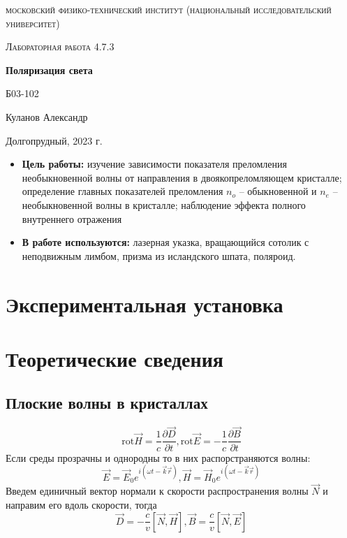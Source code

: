 \documentclass[a4paper, 12pt]{article}
\begin{document}
\begin{titlepage}
	\centering
	\vspace{5cm}
	{\scshape\LARGE московский физико-технический институт (национальный исследовательский университет) \par}
	\vspace{6cm}
	{\scshape\Large Лабораторная работа 4.7.3 \par}
	{\huge\bfseries Поляризация света \par}
	\vspace{1cm}
	\vfill
\begin{flushright}
	{\large Б03-102}\par
	\vspace{0.3cm}
	{\LARGE Куланов Александр}
\end{flushright}
	

	\vfill


	Долгопрудный, 2023 г.
\end{titlepage}

\begin{itemize}
	\item \textbf{Цель работы:} изучение зависимости показателя преломления необыкновенной волны от направления в двоякопреломляющем кристалле; определение главных показателей преломления $n_o$ -- обыкновенной и $n_e$ -- необыкновенной волны в кристалле; наблюдение эффекта полного внутреннего отражения
    \item \textbf{В работе используются:} лазерная указка, вращающийся сотолик с неподвижным лимбом, призма из исландского шпата, поляроид.
\end{itemize}

\section{Экспериментальная установка}

\section{Теоретические сведения}

\subsection*{Плоские волны в кристаллах}
\begin{equation}
\text{rot} \vec{H} = \dfrac{1}{c}\dfrac{\partial \vec{D}}{\partial t}, \text{rot} \vec{E} = -\dfrac{1}{c}\dfrac{\partial \vec{B}}{\partial t}
\end{equation}
Если среды прозрачны и однородны то в них распорстраняются волны:
\begin{equation}
\vec E = \vec{E}_0 e^{i(\omega t - \vec{k}\vec{r})}, \vec{H} = \vec{H}_0e^{i(\omega t - \vec{k}\vec{r})}
\end{equation}
Введем единичный вектор нормали к скорости распространения волны $\vec{N}$ и направим его вдоль скорости, тогда
\begin{equation}
\vec{D} = -\dfrac{c}{v}\left[\vec{N}, \vec{H}\right], \vec{B} = \dfrac{c}{v}\left[	\vec{N}, \vec{E}\right]
\end{equation}
\end{document}

